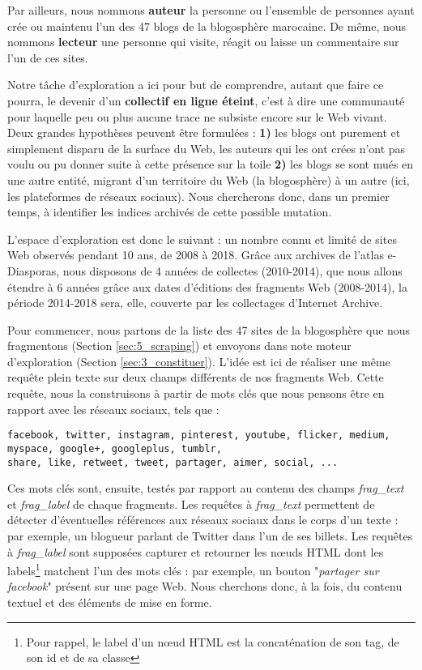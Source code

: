 \documentclass[symmetric,justified,marginals=raggedouter]{tufte-book}
\begin{document}
Par ailleurs, nous nommons \textbf{auteur} la personne ou l'ensemble de personnes ayant crée ou maintenu l'un des 47 blogs de la blogosphère marocaine. De même, nous nommons \textbf{lecteur} une personne qui visite, réagit ou laisse un commentaire sur l'un de ces sites.

Notre tâche d'exploration a ici pour but de comprendre, autant que faire ce pourra, le devenir d'un \textbf{collectif en ligne éteint}, c'est à dire une communauté pour laquelle peu ou plus aucune trace ne subsiste encore sur le Web vivant. Deux grandes hypothèses peuvent être formulées : \textbf{1)} les blogs ont purement et simplement disparu de la surface du Web, les auteurs qui les ont crées n'ont pas voulu ou pu donner suite à cette présence sur la toile \textbf{2)} les blogs se sont mués en une autre entité, migrant d'un territoire du Web (la blogosphère) à un autre (ici, les plateformes de réseaux sociaux). Nous chercherons donc, dans un premier temps, à identifier les indices archivés de cette possible mutation. 

L'espace d'exploration est donc le suivant : un nombre connu et limité de sites Web observés pendant 10 ans, de 2008 à 2018. Grâce aux archives de l'atlas e-Diasporas, nous disposons de 4 années de collectes (2010-2014), que nous allons étendre à 6 années grâce aux dates d'éditions des fragments Web (2008-2014), la période 2014-2018 sera, elle, couverte par les collectages d'Internet Archive. 

Pour commencer, nous partons de la liste des 47 sites de la blogosphère que nous fragmentons (Section \ref{sec:5_scraping}) et envoyons dans note moteur d'exploration (Section \ref{sec:3_constituer}). L'idée est ici de réaliser une même requête plein texte sur deux champs différents de nos fragments Web. Cette requête, nous la construisons à partir de mots clés que nous pensons être en rapport avec les réseaux sociaux, tels que :

\begin{figure*}
\small
\begin{verbatim}
facebook, twitter, instagram, pinterest, youtube, flicker, medium, myspace, google+, googleplus, tumblr, 
share, like, retweet, tweet, partager, aimer, social, ... 
\end{verbatim}
\end{figure*}

\noindent Ces mots clés sont, ensuite, testés par rapport au contenu des champs \textit{frag\_text} et \textit{frag\_label} de chaque fragments. Les requêtes à \textit{frag\_text} permettent de détecter d'éventuelles références aux réseaux sociaux dans le corps d'un texte : par exemple, un blogueur parlant de Twitter dans l'un de ses billets. Les requêtes à \textit{frag\_label} sont supposées capturer et retourner les nœuds HTML dont les labels\footnote{Pour rappel, le label d'un nœud HTML est la concaténation de son tag, de son id et de sa classe} matchent l'un des mots clés : par exemple, un bouton "\textit{partager sur facebook}" présent sur une page Web. Nous cherchons donc, à la fois, du contenu textuel et des éléments de mise en forme.
\end{document}
